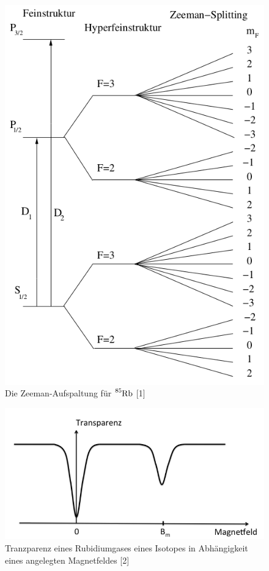 \begin{figure}[H]
    \centering
    \includegraphics[scale=0.43]{content/schema.png}
    \caption{Die Zeeman-Aufspaltung für  $\ce{^{85}Rb}$ [1]}
    \label{fig:schema}
  \end{figure}

  \begin{figure}[H]
    \centering
    \includegraphics[scale=0.4]{content/bild.png}
    \caption{Tranzparenz eines Rubidiumgases eines Isotopes in Abhängigkeit eines angelegten Magnetfeldes [2]}
    \label{fig:bild}
  \end{figure}



